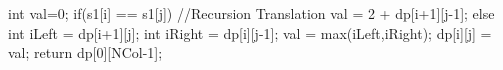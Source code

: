 \begin{solution}[Iterative]
\begin{code}
{{{                    int val=0;
                    if(s1[i] == s1[j]) //Recursion Translation
                    {
                        val = 2 + dp[i+1][j-1];
                    }
                    else
                    {
                        int iLeft = dp[i+1][j];
                        int iRight = dp[i][j-1];
                        val = max(iLeft,iRight);
                    }
                    dp[i][j] = val;
                }
            }      
            return dp[0][NCol-1];
        }
    \end{code}

 
    
\end{solution}